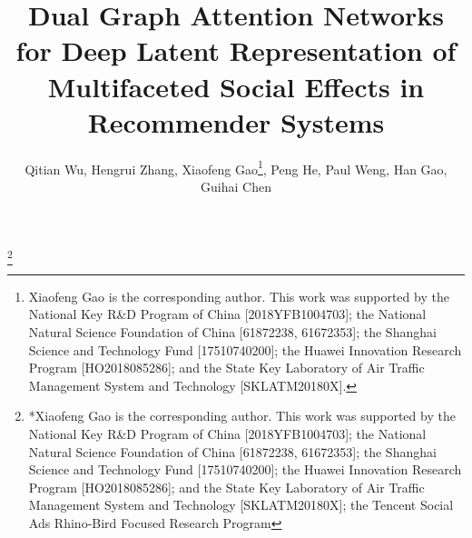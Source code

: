 \documentclass[sigconf]{acmart}
\begin{document}
\title{Dual Graph Attention Networks for Deep Latent Representation of Multifaceted Social Effects in Recommender Systems}

\author{Qitian Wu, Hengrui Zhang, Xiaofeng Gao\footnote{Xiaofeng Gao is the corresponding author. This work was supported by the National Key R\&D Program of China [2018YFB1004703]; the National Natural Science Foundation of China [61872238, 61672353]; the Shanghai Science and Technology Fund [17510740200]; the Huawei Innovation Research Program [HO2018085286]; and the State Key Laboratory of Air Traffic Management System and Technology [SKLATM20180X].}, Peng He, Paul Weng, Han Gao, Guihai Chen}
 

\thanks{*Xiaofeng Gao is the corresponding author. This work was supported by the National Key R\&D Program of China [2018YFB1004703]; the National Natural Science Foundation of China [61872238, 61672353]; the Shanghai Science and Technology Fund [17510740200]; the Huawei Innovation Research Program [HO2018085286]; and the State Key Laboratory of Air Traffic Management System and Technology [SKLATM20180X]; the Tencent Social Ads Rhino-Bird Focused Research Program}

\begin{comment}
\author{\IEEEauthorblockN{Qitian Wu, Hengrui zhang, Xiaofeng Gao\footnote{Xiaofeng Gao is the corresponding author.}, Peng He, Paul Weng, Han Gao, Guihai Chen}
	Shanghai Jiao Tong University, China\\
	WeChat, Tencent Inc.\\
	\{echo740, sqstardust\}@sjtu.edu.cn, gao-xf@cs.sjtu.edu.cn, paulhe@tencent.com, paul.weng@sjtu.edu.cn, alangao@tencent.com,
	gchen@cs.sjtu.edu.cn
}
\thanks{*Xiaofeng Gao is the corresponding author.}
\end{comment}
\end{document}
